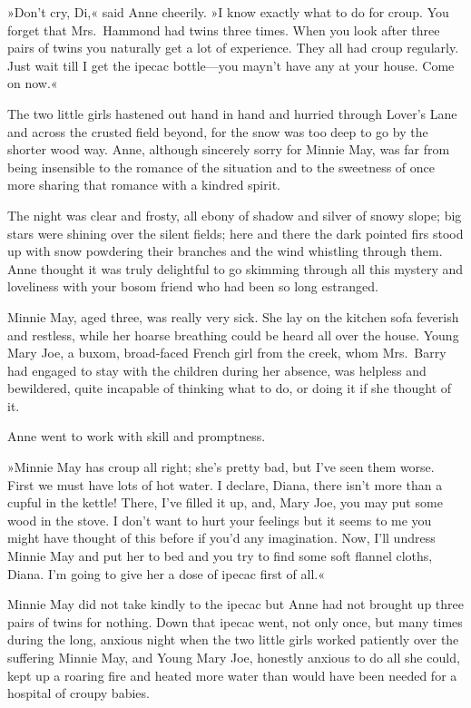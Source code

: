 »Don't cry, Di,« said Anne cheerily. »I know exactly what to do for croup. You forget that Mrs.~Hammond had twins three times. When you look after three pairs of twins you naturally get a lot of experience. They all had croup regularly. Just wait till I get the ipecac bottle—you mayn't have any at your house. Come on now.«

The two little girls hastened out hand in hand and hurried through Lover's Lane and across the crusted field beyond, for the snow was too deep to go by the shorter wood way. Anne, although sincerely sorry for Minnie May, was far from being insensible to the romance of the situation and to the sweetness of once more sharing that romance with a kindred spirit.

The night was clear and frosty, all ebony of shadow and silver of snowy slope; big stars were shining over the silent fields; here and there the dark pointed firs stood up with snow powdering their branches and the wind whistling through them. Anne thought it was truly delightful to go skimming through all this mystery and loveliness with your bosom friend who had been so long estranged.

Minnie May, aged three, was really very sick. She lay on the kitchen sofa feverish and restless, while her hoarse breathing could be heard all over the house. Young Mary Joe, a buxom, broad-faced French girl from the creek, whom Mrs.~Barry had engaged to stay with the children during her absence, was helpless and bewildered, quite incapable of thinking what to do, or doing it if she thought of it.

Anne went to work with skill and promptness.

»Minnie May has croup all right; she's pretty bad, but I've seen them worse. First we must have lots of hot water. I declare, Diana, there isn't more than a cupful in the kettle! There, I've filled it up, and, Mary Joe, you may put some wood in the stove. I don't want to hurt your feelings but it seems to me you might have thought of this before if you'd any imagination. Now, I'll undress Minnie May and put her to bed and you try to find some soft flannel cloths, Diana. I'm going to give her a dose of ipecac first of all.«

Minnie May did not take kindly to the ipecac but Anne had not brought up three pairs of twins for nothing. Down that ipecac went, not only once, but many times during the long, anxious night when the two little girls worked patiently over the suffering Minnie May, and Young Mary Joe, honestly anxious to do all she could, kept up a roaring fire and heated more water than would have been needed for a hospital of croupy babies.

